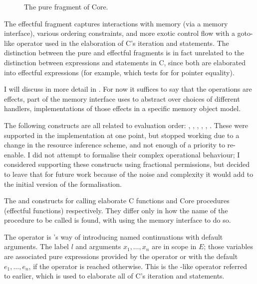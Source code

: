 \begin{figure*}[tp]
    \ContinuedFloat*
    \raggedright%
    \small%
    \cngrammarcompressed{\textwidth}{%
        \cnpce{}\cninterrule{}
        \cnname{}\cninterrule{}
        \cncpat{}\cninterrule{}
        \cnctor{}\cnafterlastrule{}
    }
    \caption{The pure fragment of Core.}\label{fig:pure-core-grammar}
\end{figure*}

The effectful fragment captures interactions with memory (via a memory
interface), various ordering constraints, and more exotic control flow with a
goto-like operator used in the elaboration of C's iteration and 
statements. The distinction between the pure and effectful fragments is in
fact unrelated to the distinction between expressions and statements in C,
since both are elaborated into effectful expressions (for example,
 which tests for for pointer equality).

I will discuss  in more detail in %
. For now it suffices to say that the
operations are effects, part of the memory interface  uses to abstract
over choices of different handlers, implementations of those effects in a
specific memory object model.

The following constructs are all related to evaluation order:
, , , %
, , . %
These were supported in the implementation at one point, but stopped working due to a change in the resource
inference scheme, and not enough of a priority to re-enable. I did not attempt
to formalise their complex operational behaviour; I considered supporting these
constructs using fractional permissions, but decided to leave that for future
work because of the noise and complexity it would add to the initial version of
the formalisation.

The  and  constructs for calling %
elaborate C functions and Core procedures (effectful functions) respectively.
They differ only in how the name of the procedure to be called is found, with
 using the memory interface to do so. %

The  operator is 's way of introducing named %
continuations with default arguments. The label $l$ and arguments $x_1, \ldots,
x_n$ are in scope in $E$; those variables are associated pure expressions
provided by the  operator or with the default $e_1, \ldots, %
e_n$, if the operator is reached otherwise. This is the -like
operator referred to earlier, which is used to elaborate all of C's iteration
and  statements.

